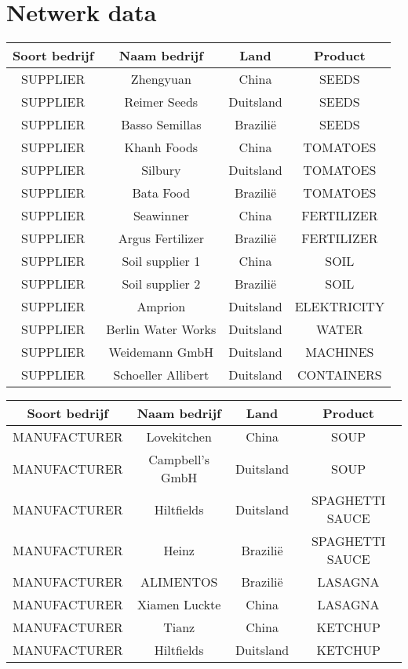 \section{Netwerk data}
\begin{center}
	\begin{tabular}{ | c | c | c | c |}
		\hline
		\textbf{Soort bedrijf} & \textbf{Naam bedrijf} & \textbf{Land} & \textbf{Product} \\ \hline
		SUPPLIER & Zhengyuan & China & SEEDS \\ \hline
		SUPPLIER & Reimer Seeds & Duitsland & SEEDS \\ \hline
		SUPPLIER & Basso Semillas & Brazilië & SEEDS \\ \hline
		SUPPLIER & Khanh Foods & China & TOMATOES \\ \hline
		SUPPLIER & Silbury & Duitsland & TOMATOES \\ \hline
		SUPPLIER & Bata Food & Brazilië & TOMATOES \\ \hline
		SUPPLIER & Seawinner & China & FERTILIZER \\ \hline
		SUPPLIER & Argus Fertilizer & Brazilië & FERTILIZER \\ \hline
		SUPPLIER & Soil supplier 1 & China & SOIL \\ \hline
		SUPPLIER & Soil supplier 2 & Brazilië & SOIL \\ \hline
		SUPPLIER & Amprion & Duitsland & ELEKTRICITY \\ \hline
		SUPPLIER & Berlin Water Works & Duitsland & WATER \\ \hline
		SUPPLIER & Weidemann GmbH & Duitsland & MACHINES \\ \hline
		SUPPLIER & Schoeller Allibert & Duitsland & CONTAINERS \\ \hline
	\end{tabular}
\end{center}
\begin{center}
	\begin{tabular}{ | c | c | c | c |}
		\hline
		\textbf{Soort bedrijf} & \textbf{Naam bedrijf} & \textbf{Land} & \textbf{Product} \\ \hline
		MANUFACTURER & Lovekitchen & China & SOUP \\ \hline
		MANUFACTURER & Campbell's GmbH & Duitsland & SOUP \\ \hline
		MANUFACTURER & Hiltfields & Duitsland & SPAGHETTI SAUCE \\ \hline
		MANUFACTURER & Heinz & Brazilië & SPAGHETTI SAUCE \\ \hline
		MANUFACTURER & ALIMENTOS & Brazilië & LASAGNA \\ \hline
		MANUFACTURER & Xiamen Luckte & China & LASAGNA \\ \hline
		MANUFACTURER & Tianz & China & KETCHUP \\ \hline
		MANUFACTURER & Hiltfields & Duitsland & KETCHUP \\ \hline
	\end{tabular}
\end{center}
